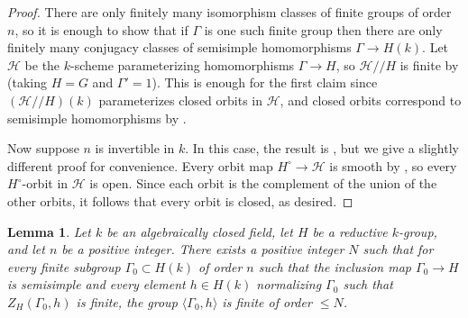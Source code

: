 \documentclass[reqno]{amsart}
\numberwithin{equation}{subsection}
\newcommand\sH{\mathscr{H}}
\newtheorem{lemma}[thm]{Lemma}
\theoremstyle{remark}
\numberwithin{equation}{subsection}
\numberwithin{figure}{subsection}
\begin{document}
\begin{proof}
There are only finitely many isomorphism classes of finite groups of order $n$, so it is enough to show that if $\Gamma$ is one such finite group then there are only finitely many conjugacy classes of semisimple homomorphisms $\Gamma \to H(k)$. Let $\sH$ be the $k$-scheme parameterizing homomorphisms $\Gamma \to H$, so $\sH/\!/H$ is finite by \cite[Theorem 1.1]{Cot24} (taking $H = G$ and $\Gamma' = 1$). This is enough for the first claim since $(\sH/\!/H)(k)$ parameterizes closed orbits in $\sH$, and closed orbits correspond to semisimple homomorphisms by \cite[Corollary 3.7, \S6.3]{BMR05}. 

Now suppose $n$ is invertible in $k$. In this case, the result is \cite[Lemma 2.6]{BMR05}, but we give a slightly different proof for convenience. Every orbit map $H^\circ \to \sH$ is smooth by \cite[Lemma A.1]{DHKM25}, so every $H^\circ$-orbit in $\sH$ is open. Since each orbit is the complement of the union of the other orbits, it follows that every orbit is closed, as desired.
\end{proof}

\begin{lemma}\label{lemma:big-finiteness-claim}
Let $k$ be an algebraically closed field, let $H$ be a reductive $k$-group, and let $n$ be a positive integer. There exists a positive integer $N$ such that for every finite subgroup $\Gamma_0 \subset H(k)$ of order $n$ such that the inclusion map $\Gamma_0 \to H$ is semisimple and every element $h \in H(k)$ normalizing $\Gamma_0$ such that $Z_H(\Gamma_0, h)$ is finite, the group $\langle \Gamma_0, h\rangle$ is finite of order $\leq N$.
\end{lemma}
\end{document}
